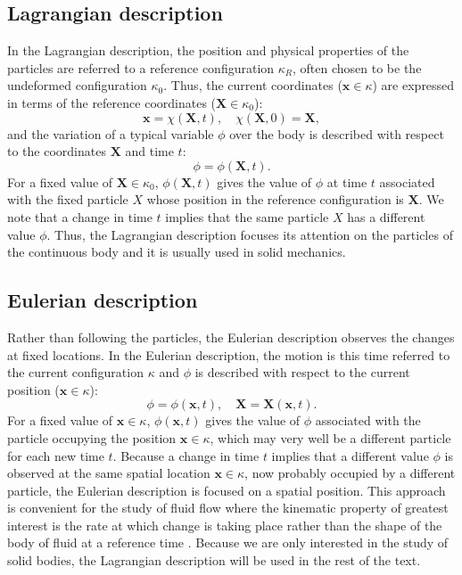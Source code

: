 	\subsection{Lagrangian description}
In the Lagrangian description, the position and physical properties of the particles are referred to a reference configuration $\kappa_{R}$, often chosen to be the undeformed configuration $\kappa_{0}$. Thus, the current coordinates ($\mathbf{x} \in \kappa$) are expressed in terms of the reference coordinates ($\mathbf{X} \in \kappa_{0}$): 
\begin{equation}
\textbf{x} = \chi(\textbf{X}, t), \quad \chi(\textbf{X}, 0) = \textbf{X},
\end{equation}
and the variation of a typical variable $\phi$ over the body is described with respect to the coordinates $\mathbf{X}$ and time $t$:
\begin{equation}
\phi = \phi(\textbf{X}, t).
\end{equation}
For a fixed value of $\mathbf{X} \in \kappa_{0}$, $\phi(\mathbf{X},t)$ gives the value of $\phi$ at time $t$ associated with the fixed particle $X$ whose position in the reference configuration is $\mathbf{X}$. We note that a change in time $t$ implies that the same particle $X$ has a different value $\phi$. Thus, the Lagrangian description focuses its attention on the particles of the continuous body and it is usually used in solid mechanics.
	
	\subsection{Eulerian description}
Rather than following the particles, the Eulerian description observes the changes at fixed locations. 	In the Eulerian description, the motion is this time referred to the current configuration $\kappa$ and $\phi$ is described with respect to the current position ($\mathbf{x} \in \kappa$):
\begin{equation}
\phi = \phi(\textbf{x}, t), \quad \textbf{X} = \textbf{X}(\textbf{x}, t).
\end{equation}
For a fixed value of $\mathbf{x} \in \kappa$, $\phi(\mathbf{x},t)$ gives the value of $\phi$ associated with the particle occupying the position $\textbf{x} \in \kappa$, which may very well be a different particle for each new time $ t $. Because a change in time $t$ implies that a different value $\phi$ is observed at the same spatial location $\mathbf{x} \in \kappa$, now probably occupied by a different particle, the Eulerian description is focused on a spatial position. This approach is convenient for the study of fluid flow where the kinematic property of greatest interest is the rate at which change is taking place rather than the shape of the body of fluid at a reference time \citep{Spencer80}. Because we are only interested in the study of solid bodies, the Lagrangian description will be used in the rest of the text. 
	
